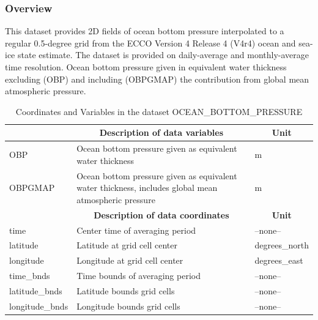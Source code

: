 \subsubsection{Overview}
This dataset provides 2D fields of ocean bottom pressure interpolated to a regular 0.5-degree grid from the ECCO Version 4 Release 4 (V4r4) ocean and sea-ice state estimate. The dataset is provided on daily-average and monthly-average time resolution. Ocean bottom pressure given in equivalent water thickness excluding (OBP) and including (OBPGMAP) the contribution from global mean atmospheric pressure. 
\begin{longtable}{|m{}|m{}|m{}|}
\caption{Coordinates and Variables in the dataset OCEAN\_BOTTOM\_PRESSURE}
\label{tab:table-OCEAN_BOTTOM_PRESSURE-fields} \\ 
\hline \endhead \hline \endfoot
\rowcolor{lightgray} \multicolumn{1}{|c|}{\textbf{Variables}} & \multicolumn{1}{|c|}{\textbf{Description of data variables}} &  \multicolumn{1}{|c|}{\textbf{Unit}}\\ \hline
OBP &Ocean bottom pressure given as equivalent water thickness &m  \\ \hline
OBPGMAP &Ocean bottom pressure given as equivalent water thickness, includes global mean atmospheric pressure &m  \\ \hline
\rowcolor{lightgray} \multicolumn{1}{|c|}{\textbf{Coordinates}} & \multicolumn{1}{|c|}{\textbf{Description of data coordinates}} &  \multicolumn{1}{|c|}{\textbf{Unit}}\\ \hline
time &Center time of averaging period &--none--  \\ \hline
latitude &Latitude at grid cell center &degrees\_north  \\ \hline
longitude &Longitude at grid cell center &degrees\_east  \\ \hline
time\_bnds &Time bounds of averaging period &--none--  \\ \hline
latitude\_bnds &Latitude bounds grid cells &--none--  \\ \hline
longitude\_bnds &Longitude bounds grid cells &--none--  \\ \hline
\end{longtable}

\newp
\pagebreak
